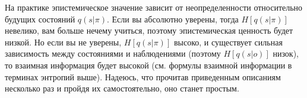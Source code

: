 \documentclass[twoside,leqno, 11pt]{article}
\begin{document}
	\newpage
	
	\begin{figure}[h]
	\end{figure}
	
	На практике эпистемическое значение зависит от неопределенности относительно будущих состояний $q(s|\pi)$. Если вы абсолютно уверены, тогда $H[q(s|\pi)]$ невелико, вам больше нечему учиться, поэтому эпистемическая ценность будет низкой. Но если вы не уверены, $H[q(s|\pi)]$ высоко, и существует сильная зависимость между состояниями и наблюдениями (поэтому $H[q(s|o)]$ низок), то взаимная информация будет высокой (см. формулы взаимной информации в терминах энтропий выше). Надеюсь, что прочитав приведенным описаниям несколько раз и пройдя их самостоятельно, оно станет простым.
	
	
\end{document}
